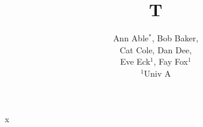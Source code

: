 \documentclass{article}
\title{T}
\author{Ann Able$^{*}$, Bob Baker, \\ Cat Cole, Dan Dee, \\ Eve Eck$^{1}$, Fay Fox$^{1}$\\ $^{1}$Univ A}
\begin{document}
\maketitle
x
\end{document}
